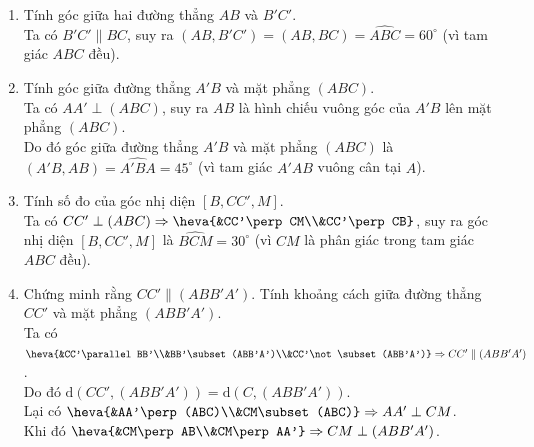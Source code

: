 \begin{bt}
{\begin{center}
		\end{center}
		\begin{enumerate}
			\item Tính góc giữa hai đường thẳng $AB$ và $B'C'$.\\
			Ta có $B'C'\parallel BC$, suy ra $(AB,B'C')=(AB,BC)=\widehat{ABC}=60^\circ$ (vì tam giác $ABC$ đều).
			\item Tính góc giữa đường thẳng $A'B$ và mặt phẳng $(ABC)$.\\
			Ta có $AA'\perp (ABC)$, suy ra $AB$ là hình chiếu vuông góc của $A'B$ lên mặt phẳng $(ABC)$.\\
			Do đó góc giữa đường thẳng $A'B$ và mặt phẳng $(ABC)$ là $(A'B,AB)=\widehat{A'BA}=45^\circ$ (vì tam giác $A'AB$ vuông cân tại $A$).
			\item Tính số đo của góc nhị diện $[B,CC',M]$.\\
			Ta có $CC'\perp (ABC)\Rightarrow \heva{&CC'\perp CM\\&CC'\perp CB}$, suy ra góc nhị diện $[B,CC',M]$ là $\widehat{BCM}=30^\circ$ (vì $CM$ là phân giác trong tam giác $ABC$ đều).
			\item Chứng minh rằng $CC'\parallel (ABB'A')$. Tính khoảng cách giữa đường thẳng $CC'$ và mặt phẳng $(ABB'A')$.\\
			Ta có $\heva{&CC'\parallel BB'\\&BB'\subset (ABB'A')\\&CC'\not\subset (ABB'A')}\Rightarrow CC'\parallel (ABB'A')$.\\ Do đó $\mathrm{d}(CC',(ABB'A'))=\mathrm{d}(C,(ABB'A'))$.\\
			Lại có $\heva{&AA'\perp (ABC)\\&CM\subset (ABC)}\Rightarrow AA'\perp CM$.\\
			Khi đó $\heva{&CM\perp AB\\&CM\perp AA'}\Rightarrow CM\perp (ABB'A')$.\\

\end{enumerate}}
\end{bt}
